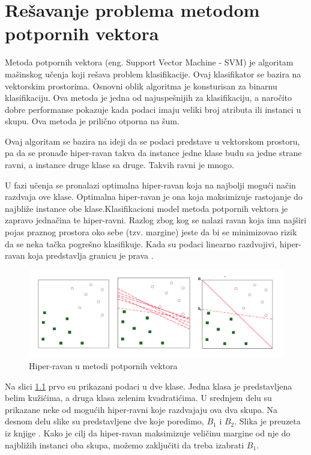 \documentclass[12pt,oneside]{memoir}
\begin{document}
\chapter{Rešavanje problema metodom potpornih vektora}

Metoda potpornih vektora (eng. Support Vector Machine - SVM) je algoritam mašinskog učenja koji rešava problem klasifikacije. Ovaj klasifikator se bazira na vektorskim prostorima. Osnovni oblik algoritma je konsturisan za binarnu klasifikaciju. Ova metoda je jedna od najuspešnijih za klasifikaciju, a naročito dobre performanse pokazuje kada podaci imaju veliki broj atributa ili instanci u skupu. Ova metoda je prilično otporna na šum.

Ovaj algoritam se bazira na ideji da se podaci predstave u vektorskom prostoru, pa da se pronađe hiper-ravan takva da instance jedne klase budu sa jedne strane ravni, a instance druge klase sa druge. Takvih ravni je mnogo.

U fazi učenja se pronalazi optimalna hiper-ravan koja na najbolji mogući način razdvaja ove klase. Optimalna hiper-ravan je ona koja maksimizuje rastojanje do najbliže instance obe klase.Klasifikacioni model metoda potpornih vektora je zapravo jednačina te hiper-ravni. Razlog zbog kog se nalazi ravan koja ima najširi pojas praznog prostora oko sebe (tzv.  margine) jeste da bi se minimizovao rizik da se neka tačka pogrešno klasifikuje. Kada su podaci linearno razdvojivi, hiper-ravan koja predstavlja granicu je prava \cite{JelenaPHD}.

\begin{figure}[h!]
\centering
\includegraphics[width=.7\textwidth]{images/svm.png}
\caption{ Hiper-ravan u metodi potpornih vektora }
\label{img:svm_1}
\end{figure}

Na slici \ref{img:svm_1} prvo su prikazani podaci u dve klase. Jedna klasa je predstavljena belim kužićima, a druga klasa zelenim kvadratićima. U srednjem delu su prikazane neke od mogućih hiper-ravni koje razdvajaju ova dva skupa. Na desnom delu slike su predstavljene dve koje poredimo, $B_1$ i $B_2$. Slika je preuzeta iz knjige \cite{introductiontodm}. Kako je cilj da hiper-ravan maksimizuje veličinu margine od nje do najbližih instanci oba skupa, možemo zaključiti da treba izabrati $B_1$.
\end{document}
